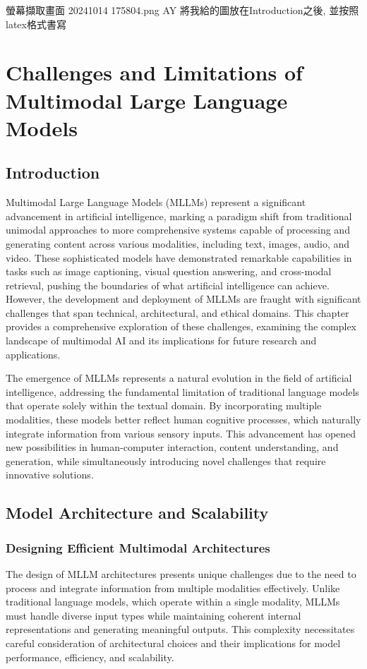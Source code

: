 螢幕擷取畫面 20241014 175804.png
AY
將我給的圖放在Introduction之後, 並按照latex格式書寫

\chapter{Challenges and Limitations of Multimodal Large Language Models}


\section{Introduction}
Multimodal Large Language Models (MLLMs) represent a significant advancement in artificial intelligence, marking a paradigm shift from traditional unimodal approaches to more comprehensive systems capable of processing and generating content across various modalities, including text, images, audio, and video. These sophisticated models have demonstrated remarkable capabilities in tasks such as image captioning, visual question answering, and cross-modal retrieval, pushing the boundaries of what artificial intelligence can achieve. However, the development and deployment of MLLMs are fraught with significant challenges that span technical, architectural, and ethical domains. This chapter provides a comprehensive exploration of these challenges, examining the complex landscape of multimodal AI and its implications for future research and applications.

The emergence of MLLMs represents a natural evolution in the field of artificial intelligence, addressing the fundamental limitation of traditional language models that operate solely within the textual domain. By incorporating multiple modalities, these models better reflect human cognitive processes, which naturally integrate information from various sensory inputs. This advancement has opened new possibilities in human-computer interaction, content understanding, and generation, while simultaneously introducing novel challenges that require innovative solutions.

\section{Model Architecture and Scalability}

\subsection{Designing Efficient Multimodal Architectures}
The design of MLLM architectures presents unique challenges due to the need to process and integrate information from multiple modalities effectively. Unlike traditional language models, which operate within a single modality, MLLMs must handle diverse input types while maintaining coherent internal representations and generating meaningful outputs. This complexity necessitates careful consideration of architectural choices and their implications for model performance, efficiency, and scalability.

